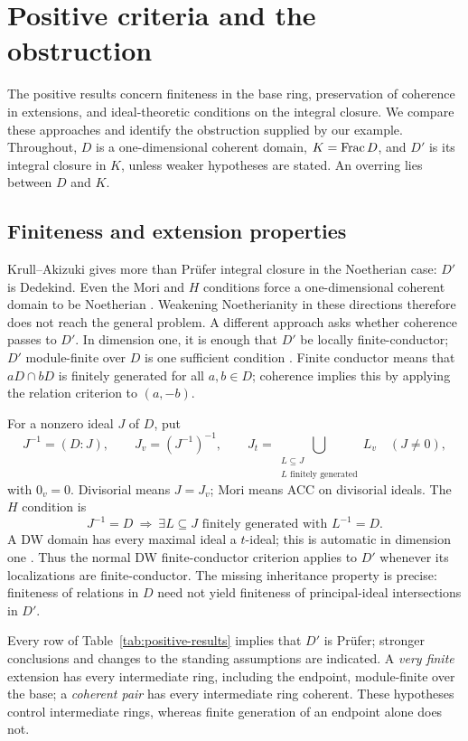 \section{Positive criteria and the obstruction}\label{sec:literature}

The positive results concern finiteness in the base ring, preservation
of coherence in extensions, and ideal-theoretic conditions on the
integral closure. We compare these approaches and identify the obstruction
supplied by our example. Throughout, $D$ is a one-dimensional coherent
domain, $K=\operatorname{Frac} D$, and $D'$ is its integral closure in $K$, unless weaker
hypotheses are stated. An overring lies between $D$ and $K$.

\subsection{Finiteness and extension properties}
Krull--Akizuki gives more than Pr\"ufer integral closure in the Noetherian
case: $D'$ is Dedekind. Even the Mori and $H$ conditions force a
one-dimensional coherent domain to be Noetherian
\cite[p.~225]{GlazVasconcelos1984}. Weakening Noetherianity in these
directions therefore does not reach the general problem. A different
approach asks whether coherence passes to $D'$. In dimension one, it
is enough that $D'$ be locally finite-conductor; $D'$ module-finite
over $D$ is one sufficient condition
\cite[Thm.~3.7, Cor.~3.9]{PicozzaTartarone2008}.
Finite conductor means that $aD\cap bD$ is finitely generated for all
$a,b\in D$; coherence implies this by applying the relation criterion
to $(a,-b)$.

For a nonzero ideal $J$ of $D$, put
\[
 J^{-1}=(D:J),\qquad J_v=(J^{-1})^{-1},\qquad
 J_t=\bigcup_{\substack{L\subseteq J\\L\text{ finitely generated}}}L_v
 \quad(J\ne0),
\]
with $0_v=0$. Divisorial means $J=J_v$; Mori means ACC on divisorial
ideals. The $H$ condition \cite[\S3]{GlazVasconcelos1977} is
\[
 J^{-1}=D\ \Longrightarrow\
 \exists L\subseteq J\text{ finitely generated with }L^{-1}=D.
\]
A DW domain has every maximal ideal a $t$-ideal; this is automatic in
dimension one \cite[Prop.~2.9]{PicozzaTartarone2008}. Thus the normal
DW finite-conductor criterion applies to $D'$ whenever its localizations
are finite-conductor. The missing inheritance property is precise:
finiteness of relations in $D$ need not yield finiteness of
principal-ideal intersections in $D'$.

Every row of Table~\ref{tab:positive-results} implies that $D'$ is
Pr\"ufer; stronger conclusions and changes to the standing assumptions
are indicated. A \emph{very finite} extension has every intermediate
ring, including the endpoint, module-finite over the base; a
\emph{coherent pair} has every intermediate ring coherent. These
hypotheses control intermediate rings, whereas finite generation of
an endpoint alone does not.

